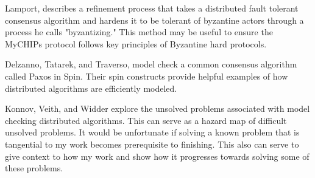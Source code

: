 \documentclass[article, onecolumn, 12pt]{IEEEtran}
\begin{document}
 Lamport\cite{Lamport}, describes a refinement process that takes a distributed fault tolerant consensus algorithm and hardens it to be tolerant of byzantine actors through a process he calls "byzantizing." This method may be useful to ensure the MyCHIPs protocol follows key principles of Byzantine hard protocols.
 
 Delzanno, Tatarek, and Traverso, model check a common consensus algorithm called Paxos in Spin. Their spin constructs provide helpful examples of how distributed algorithms are efficiently modeled.\cite{Delzanno_2014}
 
 Konnov, Veith, and Widder explore the unsolved problems associated with model checking distributed algorithms. This can serve as a hazard map of difficult unsolved problems. It would be unfortunate if solving a known problem that is tangential to my work becomes prerequisite to finishing. This also can serve to give context to how my work and show how it progresses towards solving some of these problems.\cite{Konnov}



\end{document}
